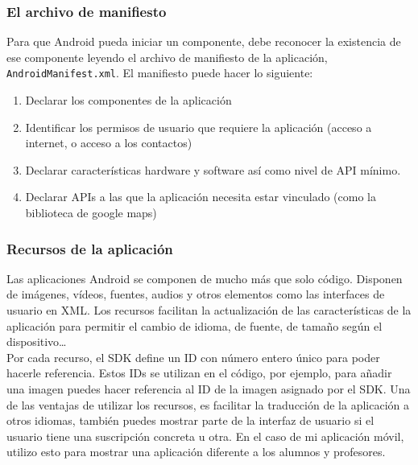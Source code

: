 \subsubsection{El archivo de manifiesto}

Para que Android pueda iniciar un componente, debe reconocer la existencia de ese componente leyendo el archivo de manifiesto de la aplicación, \verb|AndroidManifest.xml|. El manifiesto puede hacer lo siguiente:
\begin{enumerate}
    \item Declarar los componentes de la aplicación
    \item Identificar los permisos de usuario que requiere la aplicación (acceso a internet, o acceso a los contactos)
    \item Declarar características hardware y software así como nivel de API mínimo.
    \item Declarar APIs a las que la aplicación necesita estar vinculado (como la biblioteca de google maps)
\end{enumerate}

\subsubsection{Recursos de la aplicación}

Las aplicaciones Android se componen de mucho más que solo código. Disponen de imágenes, vídeos, fuentes, audios y otros elementos como las interfaces de usuario en XML. Los recursos facilitan la actualización de las características de la aplicación para permitir el cambio de idioma, de fuente, de tamaño según el dispositivo\dots \\

Por cada recurso, el SDK define un ID con número entero único para poder hacerle referencia. Estos IDs se utilizan en el código, por ejemplo, para añadir una imagen puedes hacer referencia al ID de la imagen asignado por el SDK. Una de las ventajas de utilizar los recursos, es facilitar la traducción de la aplicación a otros idiomas, también puedes mostrar parte de la interfaz de usuario si el usuario tiene una suscripción concreta u otra. En el caso de mi aplicación móvil, utilizo esto para mostrar una aplicación diferente  a los alumnos y profesores.

